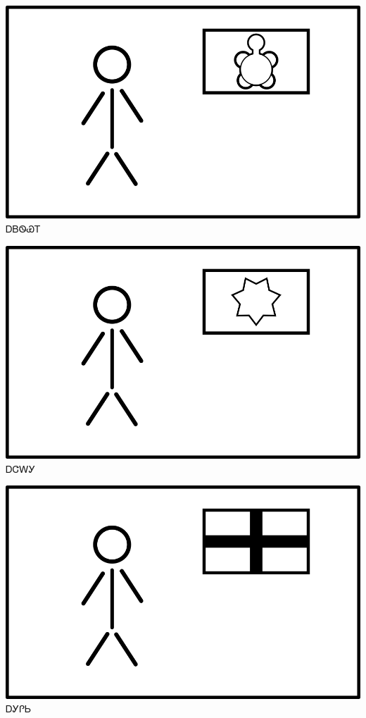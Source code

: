 \documentclass[avery5371]{flashcards}%
\begin{document}

    \begin{flashcard}{
        \includegraphics[width=0.95\columnwidth,height=.51\columnwidth,keepaspectratio]{../artwork/flags/adaksi-flag}
    }
        \Huge ᎠᏴᏫᏯᎢ
    \end{flashcard}

    \begin{flashcard}{
        \includegraphics[width=0.95\columnwidth,height=.51\columnwidth,keepaspectratio]{../artwork/flags/ajalagi-flag}
    }
        \Huge ᎠᏣᎳᎩ
    \end{flashcard}

    \begin{flashcard}{
        \includegraphics[width=0.95\columnwidth,height=.51\columnwidth,keepaspectratio]{../artwork/flags/agilisi-flag}
    }
        \Huge ᎠᎩᎵᏏ
    \end{flashcard}
\end{document}
